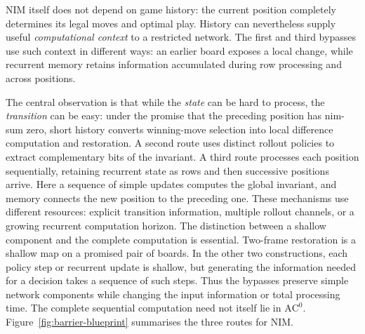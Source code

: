 \documentclass[11pt]{article}
\newcommand{\AC}{\mathrm{AC}}
\theoremstyle{plain}
\theoremstyle{definition}
\theoremstyle{remark}
\numberwithin{equation}{section}
\begin{document}
NIM itself does not depend on game history: the current position completely determines its legal moves and optimal play. History can nevertheless supply useful \emph{computational context} to a restricted network. The first and third bypasses use such context in different ways: an earlier board exposes a local change, while recurrent memory retains information accumulated during row processing and across positions.

The central observation is that while the \emph{state} can be hard to process, the \emph{transition} can be easy: under the promise that the preceding position has nim-sum zero, short history converts winning-move selection into local difference computation and restoration.
A second route uses distinct rollout policies to extract complementary bits of the invariant.
A third route processes each position sequentially, retaining recurrent state as rows and then successive positions arrive. Here a sequence of simple updates computes the global invariant, and memory connects the new position to the preceding one.
These mechanisms use different resources: explicit transition information, multiple rollout channels, or a growing recurrent computation horizon.
The distinction between a shallow component and the complete computation is essential. Two-frame restoration is a shallow map on a promised pair of boards. In the other two constructions, each policy step or recurrent update is shallow, but generating the information needed for a decision takes a sequence of such steps. Thus the bypasses preserve simple network components while changing the input information or total processing time. The complete sequential computation need not itself lie in $\AC^0$.
Figure~\ref{fig:barrier-blueprint} summarises the three routes for NIM.
\end{document}
